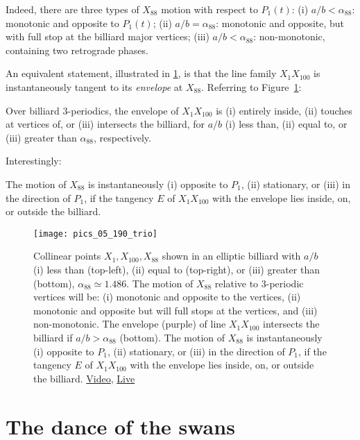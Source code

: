 Indeed, there are three types of $X_{88}$ motion with respect to $P_1(t)$: (i) $a/b<\alpha_{88}$: monotonic and opposite to $P_1(t)$; (ii) $a/b=\alpha_{88}$: monotonic and opposite, but with full stop at the billiard major vertices; (iii) $a/b<\alpha_{88}$: non-monotonic, containing two retrograde phases.

An equivalent statement, illustrated in \cref{fig:05-x88-envelope}, is that the line family $X_1 X_{100}$ is instantaneously tangent to its {\em envelope} at $X_{88}$. Referring to Figure~\ref{fig:05-x88-envelope}:

\begin{proposition}
Over billiard 3-periodics, the envelope of $X_1 X_{100}$ is (i) entirely inside, (ii) touches at vertices of, or (iii) intersects the billiard, for $a/b$ (i) less than, (ii) equal to, or (iii) greater than $\alpha_{88}$, respectively. 
\label{prop:05-x88-env}
\end{proposition}

Interestingly:

\begin{proposition}
The motion of $X_{88}$ is instantaneously (i) opposite to $P_1$, (ii) stationary, or (iii) in the direction of $P_1$, if the tangency $E$ of $X_1 X_{100}$ with the envelope lies inside, on, or outside the billiard.
\label{prop:05-x88-envelope}
\end{proposition}

\begin{figure}
    \centering
    \texttt{[image: pics\_05\_190\_trio]}
     \caption{Collinear points $X_1,X_{100},X_{88}$ shown in an elliptic billiard with $a/b$ (i) less than (top-left), (ii) equal to (top-right), or (iii) greater than (bottom), $\alpha_{88}{\simeq}1.486$. The motion of $X_{88}$ relative to 3-periodic vertices will be: (i) monotonic and opposite to the vertices, (ii) monotonic and opposite but will full stops at the vertices, and (iii) non-monotonic. The envelope (purple) of line  $X_1 X_{100}$ intersects the billiard if $a/b>\alpha_{88}$ (bottom). The motion of $X_{88}$ is instantaneously (i) opposite to $P_1$, (ii) stationary, or (iii) in the direction of $P_1$, if the tangency $E$ of $X_1 X_{100}$ with the envelope lies inside, on, or outside the billiard. \href{https://youtu.be/nJLp--JjDZU}{Video}, \href{https://bit.ly/3hKicgM}{Live}}
    \label{fig:05-x88-envelope}
\end{figure}

\section{The dance of the swans}

